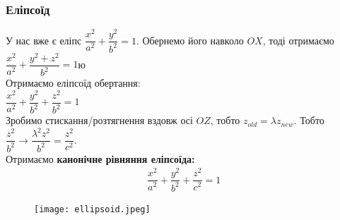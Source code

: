 \documentclass[a4paper, 10pt]{extarticle}
\theoremstyle{theoremdd}
\theoremstyle{theoremdd}
\theoremstyle{theoremdd}
\theoremstyle{theoremdd}
\theoremstyle{theoremdd}
\theoremstyle{theoremdd}
\theoremstyle{theoremdd}
\theoremstyle{theoremdd}
\begin{document}
\subsubsection{Еліпсоїд}
У нас вже є еліпс $\dfrac{x^2}{a^2} + \dfrac{y^2}{b^2} = 1$. Обернемо його навколо $OX$, тоді отримаємо $\dfrac{x^2}{a^2} + \dfrac{y^2+z^2}{b^2} = 1$ю\\
Отримаємо еліпсоїд обертання:\\
$\dfrac{x^2}{a^2} + \dfrac{y^2}{b^2} + \dfrac{z^2}{b^2} = 1$\\
Зробимо стискання/розтягнення вздовж осі $OZ$, тобто $z_{old} = \lambda z_{new}$. Тобто $\dfrac{z^2}{b^2} \to \dfrac{\lambda^2 z^2}{b^2} = \dfrac{z^2}{c^2}$.\\
Отримаємо \textbf{канонічне рівняння еліпсоїда:}
\begin{align*}
\dfrac{x^2}{a^2} + \dfrac{y^2}{b^2} + \dfrac{z^2}{c^2} = 1
\end{align*}
\begin{figure}[H]
\centering
\texttt{[image: ellipsoid.jpeg]}
\end{figure}
%
\end{document}
